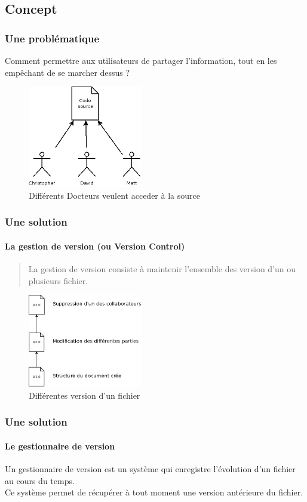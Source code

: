 \subsection{Concept}
\begin{frame}
 \frametitle{Une problématique}
    Comment permettre aux utilisateurs de partager l'information, tout en les empêchant de se marcher dessus ?
    \begin{figure}
 \centering
 \includegraphics[width=50mm]{./Img/AccesConc.png}
 \caption{Différents Docteurs veulent acceder à la source}
\end{figure}


\end{frame}
\begin{frame}
 \frametitle{Une solution}
  \framesubtitle{La gestion de version (ou Version Control)}
    \begin{quote}
     La gestion de version consiste à maintenir l'ensemble des version d'un ou plusieurs fichier. 
    \end{quote}
    \begin{figure}
 \centering
 \includegraphics[width=50mm]{./Img/VersionsFich.png}
 \caption{Différentes version d'un fichier}
\end{figure}
    
\end{frame}

\begin{frame}
\frametitle{Une solution}
  \framesubtitle{Le gestionnaire de version}
   Un gestionnaire de version est un système qui enregistre l'évolution d'un fichier au cours du temps.\\
   Ce système permet de récupérer à tout moment une version antérieure du fichier.
\end{frame}

